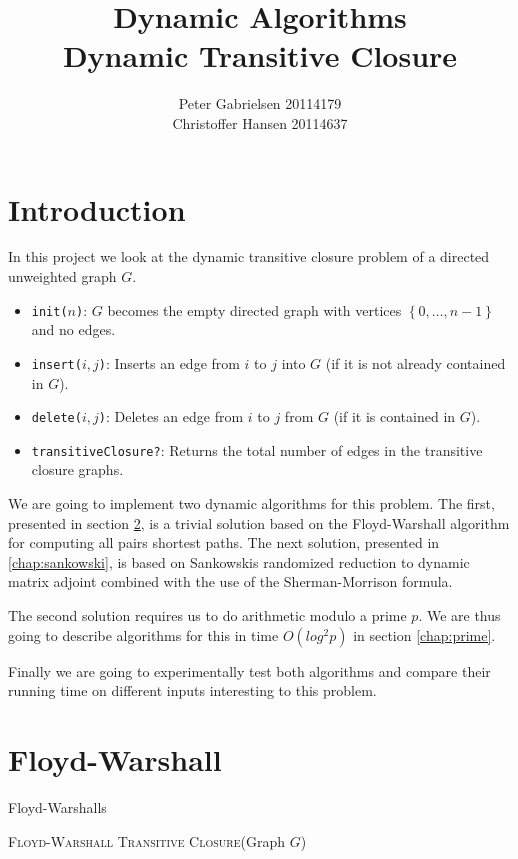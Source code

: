 \documentclass[a4paper,oneside,article,11pt]{memoir}
\title{Dynamic Algorithms \\ Dynamic Transitive Closure }
\author{Peter Gabrielsen 20114179 \\
Christoffer Hansen 20114637}
\begin{document}
\maketitle

\chapter{Introduction}
In this project we look at the dynamic transitive closure problem of a directed unweighted graph $G$.

\begin{itemize}
\item{\texttt{init($n$)}: $G$ becomes the empty directed graph with vertices $\left\lbrace 0,\dots, n-1\right\rbrace$ and no edges.}
\item{\texttt{insert($i,j$)}: Inserts an edge from $i$ to $j$ into $G$ (if it is not already contained in $G$).}
\item{\texttt{delete($i,j$)}: Deletes an edge from $i$ to $j$ from $G$ (if it is contained in $G$).}
\item{\texttt{transitiveClosure?}: Returns the total number of edges in the transitive closure graphs.}
\end{itemize}

We are going to implement two dynamic algorithms for this problem. The first, presented in section \ref{chap:fw}, is a trivial solution based on the Floyd-Warshall algorithm for computing all pairs shortest paths. The next solution, presented in \ref{chap:sankowski}, is based on Sankowskis randomized reduction to dynamic matrix adjoint combined with the use of the Sherman-Morrison formula.

The second solution requires us to do arithmetic modulo a prime $p$. We are thus going to describe algorithms for this in time $O(log^2 p)$ in section \ref{chap:prime}.

Finally we are going to experimentally test both algorithms and compare their running time on different inputs interesting to this problem.


\chapter{Floyd-Warshall}
\label{chap:fw}

Floyd-Warshalls 

\begin{algorithm}[H]
\caption{\textsc{Floyd-Warshall Transitive Closure}(Graph $G$)}
\label{alg:fw}
\begin{algorithmic}[1]
		\ENDFOR
	\ENDFOR
\ENDFOR
\end{algorithmic}
\end{algorithm}
\end{document}
